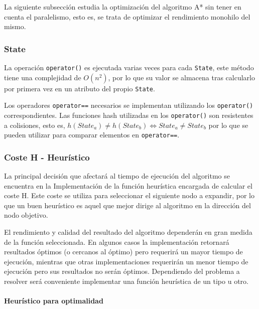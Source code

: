 La siguiente subsección estudia la optimización
del algoritmo A* sin tener en cuenta el paralelismo,
esto es, se trata de optimizar el rendimiento
monohilo del mismo.

\subsubsection{State}

La operación \lstinline{operator()} es ejecutada varias veces para cada
\lstinline{State}, este método tiene una complejidad de $O(n^2)$,
por lo que su valor se almacena tras calcularlo por primera vez
en un atributo del propio \lstinline{State}.

Los operadores \lstinline{operator==} necesarios se implementan utilizando
los \lstinline{operator()} correspondientes.
Las funciones hash utilizadas en los \lstinline{operator()}
son resistentes a colisiones,
esto es, $
h(State_a) \ne h(State_b) \iff State_a \ne State_b
$
por lo que se pueden
utilizar para comparar elementos en \lstinline{operator==}.

\pagebreak

\label{ssec:Heuristicos}
\subsubsection{Coste H - Heurístico}

La principal decisión que afectará al tiempo de ejecución
del algoritmo se encuentra en la Implementación
de la función heurística encargada de calcular el coste H.
Este coste se utiliza para seleccionar el siguiente nodo
a expandir, por lo que un buen heurístico es aquel que
mejor dirige al algoritmo en la dirección del nodo objetivo.

El rendimiento y calidad del resultado del algoritmo
dependerán en gran medida de la función seleccionada.
En algunos casos la implementación retornará resultados
óptimos (o cercanos al óptimo) pero requerirá un mayor tiempo
de ejecución, mientras que otras implementaciones
requerirán un menor tiempo de ejecución pero sus resultados
no serán óptimos.
Dependiendo del problema a resolver será conveniente implementar
una función heurística de un tipo u otro.

\paragraph{Heurístico para optimalidad}~

